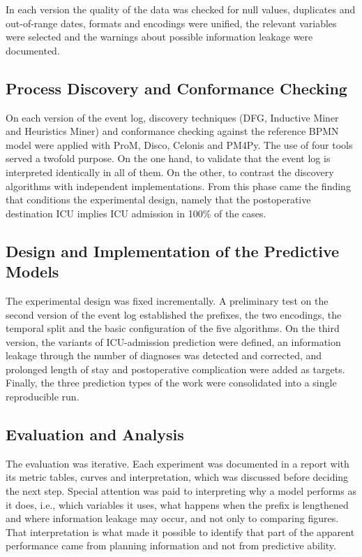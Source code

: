 In each version the quality of the data was checked for null values, duplicates and out-of-range dates, formats and encodings were unified, the relevant variables were selected and the warnings about possible information leakage were documented.

\subsection{Process Discovery and Conformance Checking}

On each version of the event log, discovery techniques (DFG, Inductive Miner and Heuristics Miner) and conformance checking against the reference BPMN model were applied with ProM, Disco, Celonis and PM4Py. The use of four tools served a twofold purpose. On the one hand, to validate that the event log is interpreted identically in all of them. On the other, to contrast the discovery algorithms with independent implementations. From this phase came the finding that conditions the experimental design, namely that the postoperative destination ICU implies ICU admission in 100\% of the cases.

\subsection{Design and Implementation of the Predictive Models}

The experimental design was fixed incrementally. A preliminary test on the second version of the event log established the prefixes, the two encodings, the temporal split and the basic configuration of the five algorithms. On the third version, the variants of ICU-admission prediction were defined, an information leakage through the number of diagnoses was detected and corrected, and prolonged length of stay and postoperative complication were added as targets. Finally, the three prediction types of the work were consolidated into a single reproducible run.

\subsection{Evaluation and Analysis}

The evaluation was iterative. Each experiment was documented in a report with its metric tables, curves and interpretation, which was discussed before deciding the next step. Special attention was paid to interpreting why a model performs as it does, i.e., which variables it uses, what happens when the prefix is lengthened and where information leakage may occur, and not only to comparing figures. That interpretation is what made it possible to identify that part of the apparent performance came from planning information and not from predictive ability.

